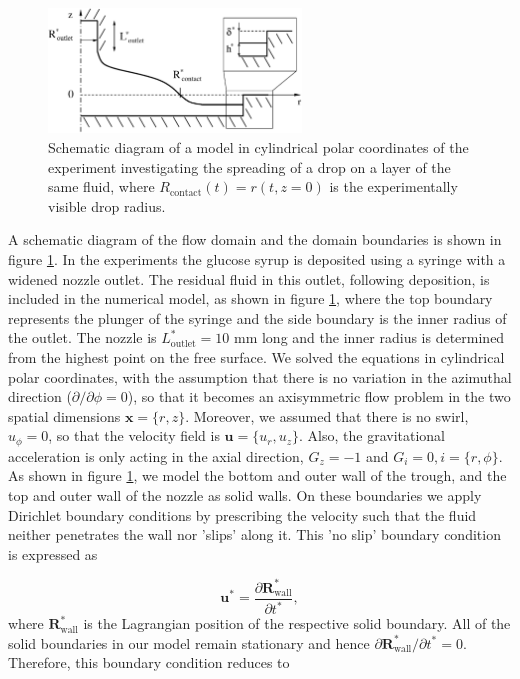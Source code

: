 \documentclass[aip,graphicx]{revtex4-1}
\newcommand{\sym}[1]{\text{#1}}
\newcommand{\pder}[2][]{\frac{\partial#1}{\partial#2}}
\newcommand{\vect}[1]{\bm{#1}}
\begin{document}
\begin{figure}[!ht]
\centering
\includegraphics[width=0.6\textwidth]{figures/axisym_drop_nozzle_gap_computation.eps}
\caption{Schematic diagram of a model in cylindrical polar coordinates of the experiment investigating the spreading of a drop on a layer of the same fluid, where $R_{\sym{contact}}(t)=r(t,z=0)$ is the experimentally visible drop radius.}
\label{fig:axisym_drop_nozzle}
\end{figure}

A schematic diagram of the flow domain and the domain boundaries is shown in figure \ref{fig:axisym_drop_nozzle}.
In the experiments the glucose syrup is deposited using a syringe with a widened nozzle outlet.
The residual fluid in this outlet, following deposition, is included in the numerical model, as shown in figure \ref{fig:axisym_drop_nozzle}, where the top boundary represents the plunger of the syringe and the side boundary is the inner radius of the outlet.
The nozzle is $L^*_{\sym{outlet}}=10$ mm long and the inner radius is determined from the highest point on the free surface.
We solved the equations in cylindrical polar coordinates, with the assumption that there is no variation in the azimuthal direction ($\partial / \partial \phi = 0$), so that it becomes an axisymmetric flow problem in the two spatial dimensions $\vect{x}=\{r,z\}$. 
Moreover, we assumed that there is no swirl, $u_{\phi}=0$, so that the velocity field is $\vect{u}=\{u_r,u_z\}$.
Also, the gravitational acceleration is only acting in the axial direction, $G_z = -1$ and $G_i=0, i = \{ r,\phi \}$.
As shown in figure \ref{fig:axisym_drop_nozzle}, we model the bottom and outer wall of the trough, and the top and outer wall of the nozzle as solid walls.
On these boundaries we apply Dirichlet boundary conditions by prescribing the velocity such that the fluid neither penetrates the wall nor 'slips' along it. 
This 'no slip' boundary condition is expressed as

\begin{equation}
 \vect{u}^* = \pder[\vect{R}_{\sym{wall}}^*]{t^*},
 \label{eqn:ns_eqn_solid_wall_bc}
\end{equation}
where $\vect{R}_{\sym{wall}}^*$ is the Lagrangian position of the respective solid boundary. 
All of the solid boundaries in our model remain stationary and hence $\partial \vect{R}_{\sym{wall}}^*/ \partial t^* = 0$.
Therefore, this boundary condition reduces to
\end{document}
